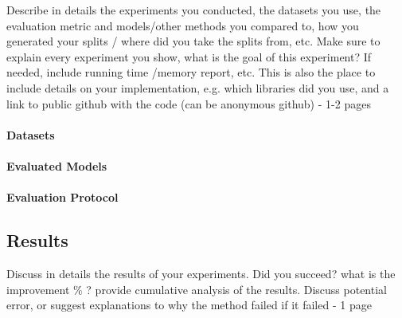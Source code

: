  Describe in details the experiments you conducted, the datasets you use, the evaluation metric and models/other methods you compared to, how you generated your splits / where did you take the splits from, etc. Make sure to explain every experiment you show, what is the goal of this experiment? If needed, include running time /memory report, etc.
This is also the place to include details on your implementation, e.g. which libraries did you use, and a link to public github with the code (can be anonymous github) - 1-2 pages

\paragraph{Datasets}

\paragraph{Evaluated Models}

\paragraph{Evaluation Protocol}

 \subsection{Results}
 Discuss in details the results of your experiments. Did you succeed? what is the improvement \% ? provide cumulative analysis of the results. Discuss potential error, or suggest explanations to why the method failed if it failed - 
 1 page